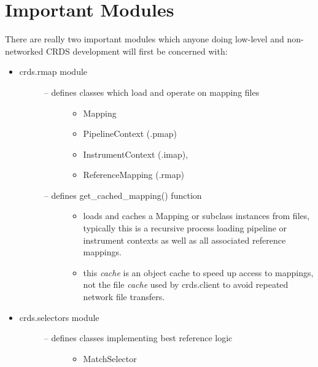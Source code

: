 \documentclass[letterpaper,10pt,english]{sphinxmanual}
\begin{document}
\section{Important Modules}
\label{core_library_functions:important-modules}
There are really two important modules which anyone doing low-level and non-
networked CRDS development will first be concerned with:
\begin{itemize}
\item {} \begin{description}
\item[{crds.rmap module}] \leavevmode\begin{description}
\item[{-- defines classes which load and operate on mapping files}] \leavevmode\begin{itemize}
\item {} 
Mapping

\item {} 
PipelineContext (.pmap)

\item {} 
InstrumentContext (.imap),

\item {} 
ReferenceMapping (.rmap)

\end{itemize}

\item[{-- defines get\_cached\_mapping() function}] \leavevmode\begin{itemize}
\item {} 
loads and caches a Mapping or subclass instances from files,
typically this is a recursive process loading pipeline or instrument
contexts as well as all associated reference mappings.

\item {} 
this \emph{cache} is an object cache to speed up access to mappings,
not the file \emph{cache} used by crds.client to avoid repeated network
file transfers.

\end{itemize}

\end{description}

\end{description}

\item {} \begin{description}
\item[{crds.selectors module}] \leavevmode\begin{description}
\item[{-- defines classes implementing best reference logic}] \leavevmode\begin{itemize}
\item {} 
MatchSelector


\end{itemize}
\end{description}
\end{description}
\end{itemize}
\end{document}
